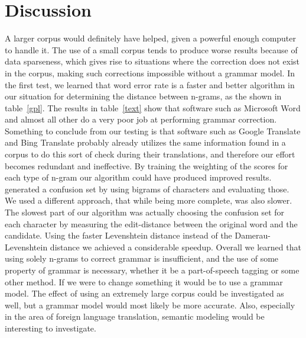 \documentclass[twocolumn]{article}
\begin{document}
\section{Discussion}
A larger corpus would definitely have helped, given a powerful enough computer
to handle it. The use of a small corpus tends to produce worse results because
of data sparseness, which gives rise to situations where the correction does not
exist in the corpus, making such corrections impossible without a grammar model.
In the first test, we learned that word error rate is a faster and better 
algorithm in our situation for determining the distance between n-grams, as the
shown in table~\ref{gpl}.
The results in table~\ref{text} show that software such as Microsoft Word and
almost all other do a very poor job at performing grammar correction.
Something to conclude from our testing is that software such as Google Translate
and Bing Translate probably already utilizes the same information found in a
corpus to do this sort of check during their translations, and therefore our
effort becomes redundant and ineffective.
By training the weighting of the scores for each type of n-gram our algorithm
could have produced improved results.
\cite{Bassil12} generated a confusion set by using bigrams of characters and
evaluating those. We used a different approach, that while being more complete,
was also slower. The slowest part of our algorithm was actually choosing the
confusion set for each character by measuring the edit-distance between the
original word and the candidate. Using the faster Levenshtein distance instead
of the Damerau-Levenshtein distance we achieved a considerable speedup. Overall
we learned that using solely n-grams to correct grammar is insufficient, and the
use of some property of grammar is necessary, whether it be a part-of-speech
tagging or some other method. If we were to change something it would be to use
a grammar model. The effect of using an extremely large corpus could be
investigated as well, but a grammar model would most likely be more accurate.
Also, especially in the area of foreign language translation, semantic modeling
would be interesting to investigate.

\small

\end{document}
